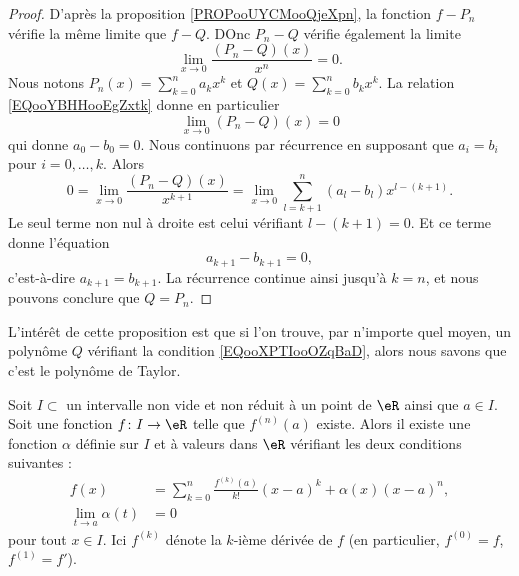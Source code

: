\begin{proof}
    D'après la proposition \ref{PROPooUYCMooQjeXpn}, la fonction \( f-P_n\) vérifie la même limite que \( f-Q\). DOnc \( P_n-Q\) vérifie également la limite
    \begin{equation}        \label{EQooYBHHooEgZxtk}
        \lim_{x\to 0} \frac{ (P_n-Q)(x) }{ x^n }=0.
    \end{equation}
    Nous notons \( P_n(x)=\sum_{k=0}^na_kx^k\) et \( Q(x)=\sum_{k=0}^nb_kx^k\). La relation \eqref{EQooYBHHooEgZxtk} donne en particulier 
    \begin{equation}
        \lim_{x\to 0} (P_n-Q)(x)=0
    \end{equation}
    qui donne \( a_0-b_0=0\). Nous continuons par récurrence en supposant que \( a_i=b_i\) pour \( i=0,\ldots, k\). Alors
    \begin{equation}
        0=\lim_{x\to 0} \frac{ (P_n-Q)(x) }{ x^{k+1} }=\lim_{x\to 0} \sum_{l=k+1}^n(a_l-b_l)x^{l-(k+1)}.
    \end{equation}
    Le seul terme non nul à droite est celui vérifiant \( l-(k+1)=0\). Et ce terme donne l'équation
    \begin{equation}
        a_{k+1}-b_{k+1}=0,
    \end{equation}
    c'est-à-dire \( a_{k+1}=b_{k+1}\). La récurrence continue ainsi jusqu'à \( k=n\), et nous pouvons conclure que \( Q=P_n\).
\end{proof}
L'intérêt de cette proposition est que si l'on trouve, par n'importe quel moyen, un polynôme \( Q\) vérifiant la condition \eqref{EQooXPTIooOZqBaD}, alors nous savons que c'est le polynôme de Taylor.

\begin{theorem}		\label{ThoTaylor}
Soit $I\subset$ un intervalle non vide et non réduit à un point de $\eR$ ainsi que $a\in I$. Soit une fonction $f\colon I\to \eR$ telle que $f^{(n)}(a)$ existe. Alors il existe une fonction $\alpha$ définie sur $I$ et à valeurs dans $\eR$ vérifiant les deux conditions suivantes :
\begin{subequations}		\label{SubEqsDevTauil}
	\begin{align}
		f(x)&= \sum_{k=0}^n\frac{ f^{(k)}(a) }{ k! }(x-a)^k +\alpha(x)(x-a)^{n},	\\	\label{subeqfTepseqb}
		\lim_{t\to a}\alpha(t)&=0
	\end{align}
\end{subequations}
pour tout \( x\in I\). Ici $f^{(k)}$ dénote la $k$-ième dérivée de $f$ (en particulier, $f^{(0)}=f$, $f^{(1)}=f'$).
\end{theorem}

